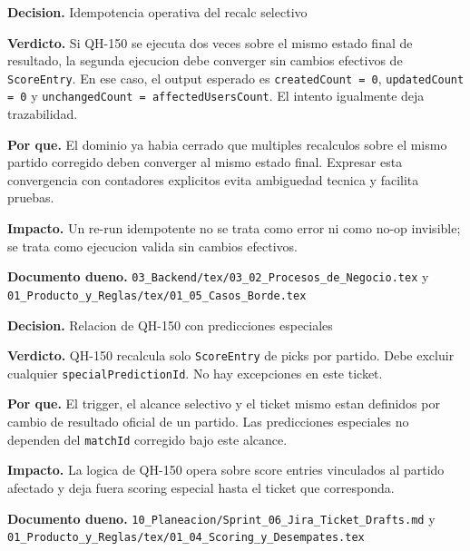 \begin{docnote}
\textbf{Decision.} Idempotencia operativa del recalc selectivo

\textbf{Verdicto.} Si QH-150 se ejecuta dos veces sobre el mismo estado final de resultado, la segunda ejecucion debe converger sin cambios efectivos de \texttt{ScoreEntry}. En ese caso, el output esperado es \texttt{createdCount = 0}, \texttt{updatedCount = 0} y \texttt{unchangedCount = affectedUsersCount}. El intento igualmente deja trazabilidad.

\textbf{Por que.} El dominio ya habia cerrado que multiples recalculos sobre el mismo partido corregido deben converger al mismo estado final. Expresar esta convergencia con contadores explicitos evita ambiguedad tecnica y facilita pruebas.

\textbf{Impacto.} Un re-run idempotente no se trata como error ni como no-op invisible; se trata como ejecucion valida sin cambios efectivos.

\textbf{Documento dueno.} \texttt{03\_Backend/tex/03\_02\_Procesos\_de\_Negocio.tex} y \texttt{01\_Producto\_y\_Reglas/tex/01\_05\_Casos\_Borde.tex}
\end{docnote}

\begin{docnote}
\textbf{Decision.} Relacion de QH-150 con predicciones especiales

\textbf{Verdicto.} QH-150 recalcula solo \texttt{ScoreEntry} de picks por partido. Debe excluir cualquier \texttt{specialPredictionId}. No hay excepciones en este ticket.

\textbf{Por que.} El trigger, el alcance selectivo y el ticket mismo estan definidos por cambio de resultado oficial de un partido. Las predicciones especiales no dependen del \texttt{matchId} corregido bajo este alcance.

\textbf{Impacto.} La logica de QH-150 opera sobre score entries vinculados al partido afectado y deja fuera scoring especial hasta el ticket que corresponda.

\textbf{Documento dueno.} \texttt{10\_Planeacion/Sprint\_06\_Jira\_Ticket\_Drafts.md} y \texttt{01\_Producto\_y\_Reglas/tex/01\_04\_Scoring\_y\_Desempates.tex}
\end{docnote}

